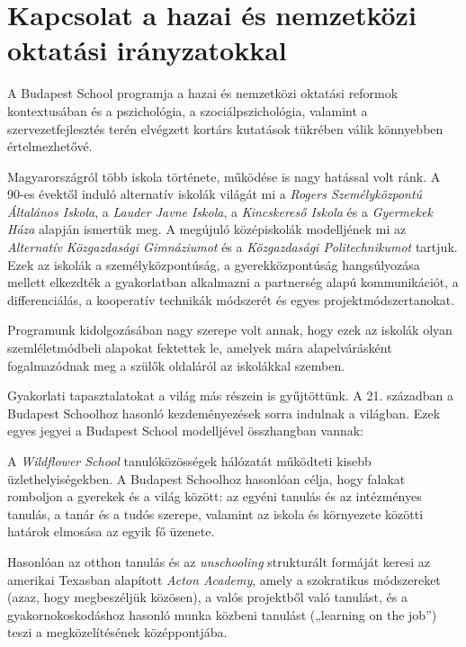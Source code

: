 \hypertarget{kapcsolat-a-hazai-es-nemzetkozi-oktatasi-iranyzatokkal}{%
\section{Kapcsolat a hazai és nemzetközi oktatási
irányzatokkal}\label{kapcsolat-a-hazai-es-nemzetkozi-oktatasi-iranyzatokkal}}

A Budapest School programja a hazai és nemzetközi oktatási reformok
kontextusában és a pszichológia, a szociálpszichológia, valamint a
szervezetfejlesztés terén elvégzett kortárs kutatások tükrében válik
könnyebben értelmezhetővé.

Magyarországról több iskola története, működése is nagy hatással volt
ránk. A 90-es évektől induló alternatív iskolák világát mi a
{\emph{Rogers Személyközpontú
Általános Iskola}}, a %
{\emph{Lauder
Javne Iskola}}, a
{\emph{Kincskereső Iskola}} és
a %
{\emph{Gyermekek Háza}} alapján
ismertük meg. A megújuló középiskolák modelljének mi az
{\emph{Alternatív Közgazdasági Gimnáziumot}}
és a %
{\emph{Közgazdasági Politechnikumot}}
tartjuk. Ezek az iskolák a személyközpontúság, a gyerekközpontúság
hangsúlyozása mellett elkezdték a gyakorlatban alkalmazni a partnerség
alapú kommunikációt, a differenciálás, a kooperatív technikák módszerét
és egyes projektmódszertanokat.

Programunk kidolgozásában nagy szerepe volt annak, hogy ezek az iskolák
olyan szemléletmódbeli alapokat fektettek le, amelyek mára
alapelvárásként fogalmazódnak meg a szülők oldaláról az iskolákkal
szemben.

Gyakorlati tapasztalatokat a világ más részein is gyűjtöttünk. A 21.
században a Budapest Schoolhoz hasonló kezdeményezések sorra indulnak a
világban. Ezek egyes jegyei a Budapest School modelljével összhangban
vannak:

A %
{\emph{Wildflower School}}
tanulóközösségek hálózatát működteti kisebb üzlethelyiségekben. A
Budapest Schoolhoz hasonlóan célja, hogy falakat\break
romboljon a gyerekek és
a világ között: az egyéni tanulás és az intézményes tanulás, a tanár és
a tudós szerepe, valamint az iskola és környezete közötti határok
elmosása az egyik fő üzenete.

Hasonlóan az otthon tanulás és az \emph{unschooling} strukturált
formáját keresi az amerikai Texasban alapított
{\emph{Acton Academy}}, amely a
szokratikus módszereket (azaz, hogy megbeszéljük közösen), a valós
projektből való tanulást, és a gyakornokoskodáshoz hasonló munka közbeni
tanulást („learning on the job'') teszi a megközelítésének középpontjába.

